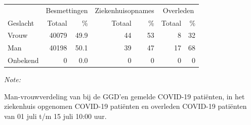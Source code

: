 \documentclass[
  english,
  man,floatsintext]{apa6}
\begin{document}
\begin{table}
\centering\begingroup\fontsize{11}{13}\selectfont

\begin{threeparttable}
\begin{tabular}{lrrrrrr}
\toprule
\multicolumn{1}{c}{ } & \multicolumn{2}{c}{Besmettingen} & \multicolumn{2}{c}{Ziekenhuisopnames} & \multicolumn{2}{c}{Overleden} \\
\cmidrule(l{3pt}r{3pt}){2-3} \cmidrule(l{3pt}r{3pt}){4-5} \cmidrule(l{3pt}r{3pt}){6-7}
Geslacht & Totaal & \% & Totaal & \% & Totaal & \%\\
\midrule
Vrouw & 40079 & 49.9 & 44 & 53 & 8 & 32\\
Man & 40198 & 50.1 & 39 & 47 & 17 & 68\\
Onbekend & 0 & 0.0 & 0 & 0 & 0 & 0\\
\bottomrule
\end{tabular}
\begin{tablenotes}
\item \textit{Note: } 
\item Man-vrouwverdeling van bij de GGD’en gemelde COVID-19 patiënten, in het ziekenhuis opgenomen COVID-19 patiënten en overleden COVID-19 patiënten van 01 juli t/m 15 juli 10:00 uur.
\end{tablenotes}
\end{threeparttable}
\endgroup{}
\end{table}
\newpage
\end{document}
